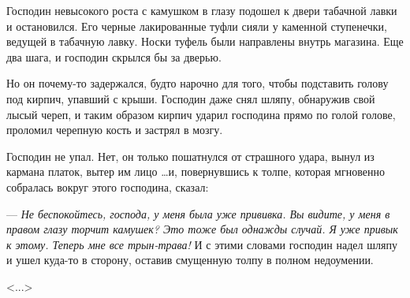 Господин невысокого роста с камушком в глазу подошел к двери табачной лавки и остановился. Его черные лакированные туфли сияли у каменной ступенечки, ведущей в табачную лавку. Носки туфель были направлены внутрь магазина. Еще два шага, и господин скрылся бы за дверью.

Но он почему-то задержался, будто нарочно для того, чтобы подставить голову под кирпич, упавший с крыши. Господин даже снял шляпу, обнаружив свой лысый череп, и таким образом кирпич ударил господина прямо по голой голове, проломил черепную кость и застрял в мозгу.

Господин не упал. Нет, он только пошатнулся от страшного удара, вынул из кармана платок, вытер им лицо \dots и, повернувшись к толпе, которая мгновенно собралась вокруг этого господина, сказал:

--- \textit{Не беспокойтесь, господа, у меня была уже прививка. Вы видите, у меня в правом глазу торчит камушек? Это тоже был однажды случай. Я уже привык к этому. Теперь мне все трын-трава!} И с этими словами господин надел шляпу и ушел куда-то в сторону, оставив смущенную толпу в полном недоумении.

\vspace{0.5em}
\hfill \textless ...\textgreater